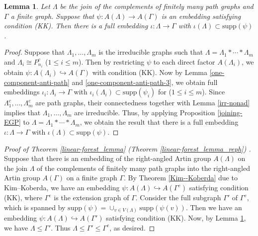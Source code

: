 \documentclass{amsart}
\theoremstyle{definition}
\theoremstyle{plain}
\newtheorem{lemma}[definition]{Lemma}
\numberwithin{equation}{section}
\begin{document}
\begin{lemma}
Let $\Lambda$ be the join of the complements of finitely many path graphs and $\Gamma$ a finite graph. 
Suppose that $\psi \colon A(\Lambda) \rightarrow A(\Gamma)$ is an embedding satisfying condition (KK). 
Then there is a full embedding $\iota \colon \Lambda \rightarrow \Gamma$ with $\iota(\Lambda) \subset  \mathrm{supp}(\psi)$. 
\label{general-case}
\end{lemma}
\begin{proof}
Suppose that $\Lambda_1, \ldots, \Lambda_m$ is the irreducible graphs such that $\Lambda= \Lambda_1 * \cdots * \Lambda_m$ and $\Lambda_i \cong P_{n_{i}}^c$ ($1 \leq i \leq m$). 
Then by restricting $\psi$ to each direct factor $A(\Lambda_i)$, we obtain $\psi \colon A(\Lambda_i) \hookrightarrow A(\Gamma)$ with condition (KK). 
Now by Lemma \ref{one-component-anti-path} and \ref{one-component-anti-path-3}, we obtain full embeddings $\iota_i \colon \Lambda_i \rightarrow \Gamma$ with $\iota_i(\Lambda_i) \subset \mathrm{supp}(\psi_i)$ for ($1 \leq i \leq m$). 
Since $\Lambda_1^c, \ldots, \Lambda_m^c$ are path graphs, their connectedness together with Lemma \ref{irr-nonad} implies that $\Lambda_1, \ldots, \Lambda_m$ are irreducible. 
Thus, by applying Proposition \ref{joining-EGP} to $\Lambda= \Lambda_1 * \cdots * \Lambda_m$, we obtain the result that there is a full embedding $\iota \colon \Lambda \rightarrow \Gamma$ with $\iota(\Lambda) \subset \mathrm{supp}(\psi)$. 
\end{proof}


\begin{proof}[Proof of Theorem \ref{linear-forest_lemma} (Theorem \ref{linear-forest_lemma_reph}) ]
Suppose that there is an embedding of the right-angled Artin group $A(\Lambda)$ on the join $\Lambda$ of the complements of finitely many path graphs into the right-angled Artin group $A(\Gamma)$ on a finite graph $\Gamma$. 
By Theorem \ref{Kim--Koberda} due to Kim--Koberda, we have an embedding $\psi \colon A(\Lambda) \hookrightarrow A(\Gamma^e)$ satisfying condition (KK), where $\Gamma^e$ is the extension graph of $\Gamma$. 
Consider the full subgraph $\Gamma'$ of $\Gamma^e$, which is spanned by $\mathrm{supp}(\psi) = \cup_{v \in V(\Lambda)} \mathrm{supp}(\psi(v))$. 
Then we have an embedding $\psi \colon A(\Lambda) \hookrightarrow A(\Gamma')$ satisfying condition (KK). 
Now, by Lemma \ref{general-case}, we have $\Lambda \leq \Gamma'$. 
Thus $\Lambda \leq \Gamma' \leq \Gamma^e$, as desired. 
\end{proof}
\end{document}

